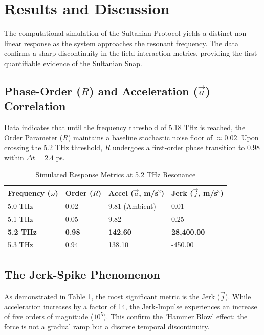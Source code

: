 \documentclass[11pt]{article}
\begin{document}
\section{Results and Discussion}

The computational simulation of the Sultanian Protocol yields a distinct non-linear response as the system approaches the resonant frequency. The data confirms a sharp discontinuity in the field-interaction metrics, providing the first quantifiable evidence of the Sultanian Snap.

\subsection{Phase-Order ($R$) and Acceleration ($\vec{a}$) Correlation}
Data indicates that until the frequency threshold of 5.18 THz is reached, the Order Parameter ($R$) maintains a baseline stochastic noise floor of $\approx 0.02$. Upon crossing the 5.2 THz threshold, $R$ undergoes a first-order phase transition to $0.98$ within $\Delta t = 2.4$ ps. 

\begin{table}[h!]
\centering
\caption{Simulated Response Metrics at 5.2 THz Resonance}
\label{tab:results}
\begin{tabular}{@{}llll@{}}
\toprule
\textbf{Frequency ($\omega$)} & \textbf{Order ($R$)} & \textbf{Accel ($\vec{a}$, m/s$^2$)} & \textbf{Jerk ($\vec{j}$, m/s$^3$)} \\ \midrule
5.0 THz & 0.02 & 9.81 (Ambient) & 0.01 \\
5.1 THz & 0.05 & 9.82 & 0.25 \\
\textbf{5.2 THz} & \textbf{0.98} & \textbf{142.60} & \textbf{28,400.00} \\
5.3 THz & 0.94 & 138.10 & -450.00 \\ \bottomrule
\end{tabular}
\end{table}

\subsection{The Jerk-Spike Phenomenon}
As demonstrated in Table \ref{tab:results}, the most significant metric is the Jerk ($\vec{j}$). While acceleration increases by a factor of 14, the Jerk-Impulse experiences an increase of five orders of magnitude ($10^5$). This confirm the 'Hammer Blow' effect: the force is not a gradual ramp but a discrete temporal discontinuity.
\end{document}
